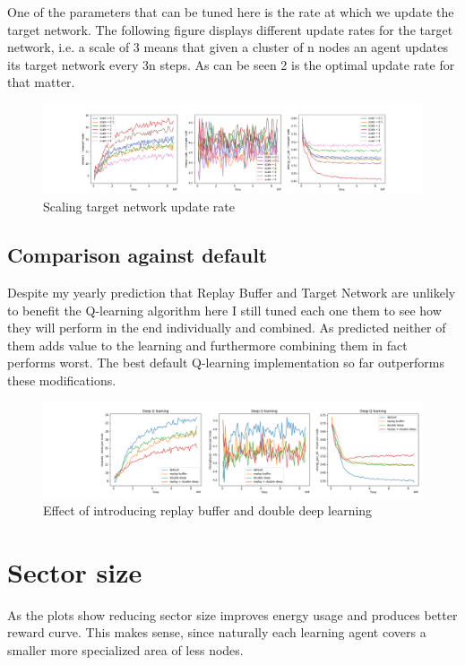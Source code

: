 One of the parameters that can be tuned here is the rate at which
we update the target network. The following figure displays
different update rates for the target network, i.e. a scale of 3
means that given a cluster of n nodes an agent updates its
target network every 3n steps. As can be seen 2 is the optimal update rate for that matter.

\begin{figure}[H]
\centering
\hspace*{-3.3cm}  
\includegraphics[scale=0.40]{plots/target_double_deep/target_update_rate_deep_q_SMALL.png}
  \caption{Scaling target network update rate}
\end{figure}

\subsection{Comparison against default}

Despite my yearly prediction that Replay Buffer and Target 
Network are unlikely to benefit the Q-learning algorithm here
I still tuned each one them to see how they will perform 
in the end individually and combined. As predicted
neither of them adds value to the learning and furthermore 
combining them in fact performs worst. The best default
Q-learning implementation so far outperforms these modifications.

\begin{figure}[H]
\centering
\hspace*{-3.3cm}  
\includegraphics[scale=0.40]{plots/target_double_deep/replay_double_SMALL.png}
  \caption{Effect of introducing replay buffer and double deep learning}
\end{figure}

\section{Sector size}
As the plots show reducing sector size improves energy
usage and produces better reward curve. This makes sense,
since naturally each learning agent covers a smaller 
more specialized area of less nodes.\\

